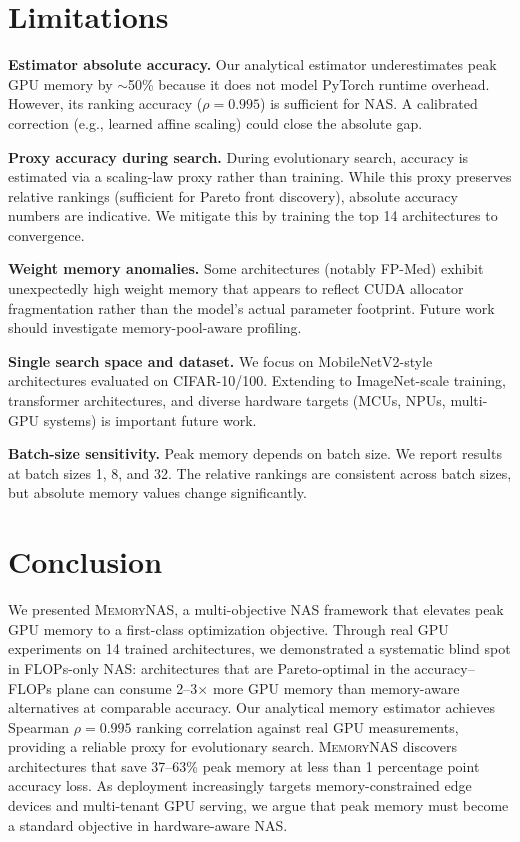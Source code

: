 \documentclass[10pt,twocolumn,letterpaper]{article}
\newcommand{\ours}{\textsc{MemoryNAS}}
\begin{document}
\section{Limitations}
\label{sec:limitations}

\textbf{Estimator absolute accuracy.} Our analytical estimator underestimates peak GPU memory by $\sim$50\% because it does not model PyTorch runtime overhead. However, its ranking accuracy ($\rho = 0.995$) is sufficient for NAS. A calibrated correction (e.g., learned affine scaling) could close the absolute gap.

\textbf{Proxy accuracy during search.} During evolutionary search, accuracy is estimated via a scaling-law proxy rather than training. While this proxy preserves relative rankings (sufficient for Pareto front discovery), absolute accuracy numbers are indicative. We mitigate this by training the top 14 architectures to convergence.

\textbf{Weight memory anomalies.} Some architectures (notably FP-Med) exhibit unexpectedly high weight memory that appears to reflect CUDA allocator fragmentation rather than the model's actual parameter footprint. Future work should investigate memory-pool-aware profiling.

\textbf{Single search space and dataset.} We focus on MobileNetV2-style architectures evaluated on CIFAR-10/100. Extending to ImageNet-scale training, transformer architectures, and diverse hardware targets (MCUs, NPUs, multi-GPU systems) is important future work.

\textbf{Batch-size sensitivity.} Peak memory depends on batch size. We report results at batch sizes 1, 8, and 32. The relative rankings are consistent across batch sizes, but absolute memory values change significantly.

\section{Conclusion}
\label{sec:conclusion}

We presented \ours{}, a multi-objective NAS framework that elevates peak GPU memory to a first-class optimization objective. Through real GPU experiments on 14 trained architectures, we demonstrated a systematic blind spot in FLOPs-only NAS: architectures that are Pareto-optimal in the accuracy--FLOPs plane can consume 2--3$\times$ more GPU memory than memory-aware alternatives at comparable accuracy. Our analytical memory estimator achieves Spearman $\rho = 0.995$ ranking correlation against real GPU measurements, providing a reliable proxy for evolutionary search. \ours{} discovers architectures that save 37--63\% peak memory at less than 1 percentage point accuracy loss. As deployment increasingly targets memory-constrained edge devices and multi-tenant GPU serving, we argue that peak memory must become a standard objective in hardware-aware NAS.

{
    \small
    
    
}
\end{document}
